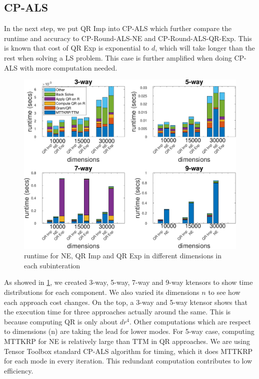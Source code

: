 \documentclass{article}
\begin{document}
\subsection{CP-ALS}

In the next step, we put QR Imp into CP-ALS which further compare the runtime and accuracy to CP-Round-ALS-NE and CP-Round-ALS-QR-Exp. 
This is known that cost of QR Exp is exponential to $d$, which will take longer than the rest when solving a LS problem.
This case is further amplified when doing CP-ALS with more computation needed.
\begin{figure}[ht!]
  \begin{center}
    \includegraphics[scale = 0.7]{Fig_kt.pdf}
    \caption[Figure]{runtime for NE, QR Imp and QR Exp in different dimensions in each subinteration \label{fig:runtime}}
  \end{center}
\end{figure}


As showed in \cref{fig:runtime}, we created 3-way, 5-way, 7-way and 9-way ktensors to show time distributions for each component.
We also varied its dimensions $n$ to see how each approach cost changes.
On the top, a 3-way and 5-way ktensor shows that the execution time for three approaches actually around the same.
This is because computing QR is only about $dr^4$.
Other computations which are respect to dimensions (n) are taking the lead for lower modes.
For 5-way case, computing MTTKRP for NE is relatively large than TTM in QR approaches.
We are using Tensor Toolbox standard CP-ALS algorithm for timing, which it does MTTKRP for each mode in every iteration.
This redundant computation contributes to low efficiency.
\end{document}
